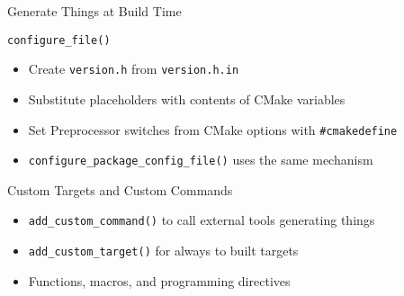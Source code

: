 \documentclass[t]{beamer}
\begin{document}
\begin{frame}{Generate Things at Build Time}
    \begin{block}{\texttt{configure\_file()}}
        \begin{itemize}
            \item Create \texttt{version.h} from
                \texttt{version.h.in}
            \item Substitute placeholders with contents of CMake
                variables
            \item Set Preprocessor switches from CMake options with
                \texttt{\#cmakedefine}
            \item \texttt{configure\_package\_config\_file()} uses the
                same mechanism
        \end{itemize}
    \end{block}

    \pause

    \begin{block}{Custom Targets and Custom Commands}
        \begin{itemize}
            \item \texttt{add\_custom\_command()} to call external tools
                generating things
            \item \texttt{add\_custom\_target()} for always to built
                targets
            \item Functions, macros, and programming directives
        \end{itemize}
    \end{block}
\end{frame}
\end{document}
